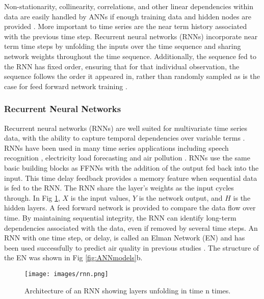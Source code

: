 Non-stationarity, collinearity, correlations, and other linear dependencies within data are easily handled by ANNs if enough training data and hidden nodes are provided \citep{Goodfellow2016}. More important to time series are the near term history associated with the previous time step. Recurrent neural networks (RNNs) incorporate near term time steps by unfolding the inputs over the time sequence and sharing network weights throughout the time sequence. Additionally, the sequence fed to the RNN has fixed order, ensuring that for that individual observation, the sequence follows the order it appeared in, rather than randomly sampled as is the case for feed forward network training \citep{Elangasinghe2014}.

\subsubsection{Recurrent Neural Networks}
Recurrent neural networks (RNNs) are well suited for multivariate time series data, with the ability to capture temporal dependencies over variable terms \citep{Che2016}. RNNs have been used in many time series applications including speech recognition \citep{Graves2013}, electricity load forecasting \citep{Walid2017} and air pollution \citep{Gomez2003}. RNNs use the same basic building blocks as FFNNs with the addition of the output fed back into the input. This time delay feedback provides a memory feature when sequential data is fed to the RNN. The RNN share the layer's weights as the input cycles through. In Fig \ref{fig:rnn}, $X$ is the input values, $Y$ is the network output, and $H$ is the hidden layers. A feed forward network is provided to compare the data flow over time. By maintaining sequential integrity, the RNN can identify long-term dependencies associated with the data, even if removed by several time steps. An RNN with one time step, or delay, is called an Elman Network (EN) and has been used successfully to predict air quality in previous studies \citep{Biancofiore2015, Biancofiore2017}. The structure of the EN was shown in Fig \ref{fig:ANNmodels}b.

%
\begin{figure}
\centering
\texttt{[image: images/rnn.png]}  %
\caption{Architecture of an RNN showing layers unfolding in time n times.}
\label{fig:rnn}
\end{figure}
%


